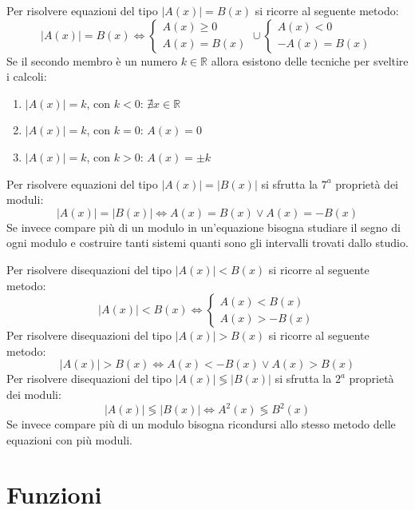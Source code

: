 \documentclass[a4paper]{article}
\theoremstyle{plain}
\theoremstyle{definition}
\theoremstyle{remark}
\newcommand{\R}{\mathbb{R}}
\begin{document}
Per risolvere equazioni del tipo $|A(x)|=B(x)$ si ricorre al seguente metodo:
\begin{equation}
    |A(x)|=B(x)\iff\begin{cases}
        A(x)\geq0\\
        A(x)=B(x)
    \end{cases}\cup\begin{cases}
        A(x)<0\\
        -A(x)=B(x)
    \end{cases}
\end{equation}
Se il secondo membro è un numero $k\in\R$ allora esistono delle tecniche per sveltire i calcoli:
\begin{enumerate}
    \item $|A(x)|=k$, con $k<0$: $\nexists x\in\R$
    \item $|A(x)|=k$, con $k=0$: $A(x)=0$
    \item $|A(x)|=k$, con $k>0$: $A(x)=\pm k$
\end{enumerate}
Per risolvere equazioni del tipo $|A(x)|=|B(x)|$ si sfrutta la $7^a$ proprietà dei moduli:
\begin{equation}
    |A(x)|=|B(x)|\iff A(x)=B(x)\lor A(x)=-B(x)
\end{equation}
Se invece compare più di un modulo in un'equazione bisogna studiare il segno di ogni modulo e costruire tanti sistemi quanti sono gli intervalli trovati dallo studio.

Per risolvere disequazioni del tipo $|A(x)|<B(x)$ si ricorre al seguente metodo:
\begin{equation}
    |A(x)|<B(x)\iff \begin{cases}
        A(x)<B(x)\\
        A(x)>-B(x)
    \end{cases}
\end{equation}
Per risolvere disequazioni del tipo $|A(x)|>B(x)$ si ricorre al seguente metodo:
\begin{equation}
    |A(x)|>B(x)\iff A(x)<-B(x)\lor A(x)>B(x)
\end{equation}
Per risolvere disequazioni del tipo $|A(x)|\lessgtr|B(x)|$ si sfrutta la $2^a$ proprietà dei moduli:
\begin{equation}
    |A(x)|\lessgtr|B(x)|\iff A^2(x)\lessgtr B^2(x)
\end{equation}
Se invece compare più di un modulo bisogna ricondursi allo stesso metodo delle equazioni con più moduli.
\newpage
\section{Funzioni}
\end{document}
